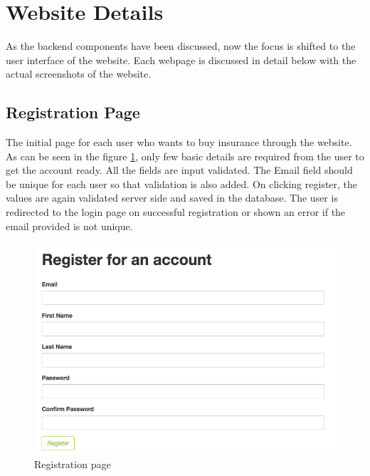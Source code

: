 \section{Website Details}
As the backend components have been discussed, now the focus is shifted to the user interface of the website. Each webpage is discussed in detail below with the actual screenshots of the website.

\subsection{Registration Page}
The initial page for each user who wants to buy insurance through the website. As can be seen in the figure \ref{fig:reg_page}, only few basic details are required from the user to get the account ready. All the fields are input validated. The Email field should be unique for each user so that validation is also added. On clicking register, the values are again validated server side and saved in the database. The user is redirected to the login page on successful registration or shown an error if the email provided is not unique.

\begin{figure}[h]
    \centering
    \includegraphics[width=\textwidth]{Figures/registration_page.png}
    \caption{Registration page}
    \label{fig:reg_page}
\end{figure}

